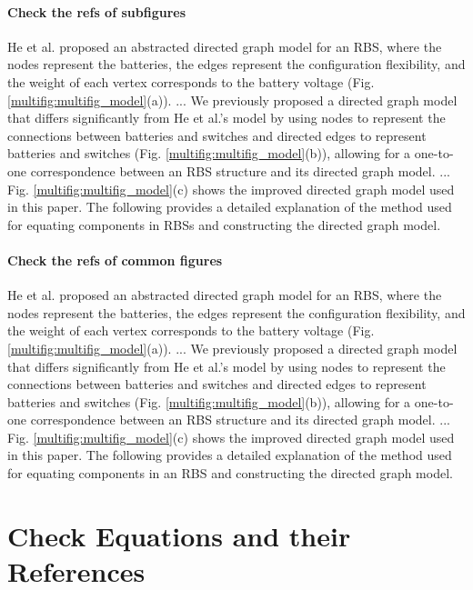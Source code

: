 \documentclass[a4paper]{article}
\begin{document}
\paragraph{Check the refs of subfigures}
He et al. \cite{heExploringAdaptiveReconfiguration2013} proposed an abstracted directed graph model for an RBS, where the nodes represent the batteries, the edges represent the configuration flexibility, and the weight of each vertex corresponds to the battery voltage (Fig. \ref{multifig:multifig_model}(a)). 
...
We previously proposed a directed graph model that differs significantly from He et al.'s model by using nodes to represent the connections between batteries and switches and directed edges to represent batteries and switches (Fig. \ref{multifig:multifig_model}(b)), allowing for a one-to-one correspondence between an RBS structure and its directed graph model. 
...
Fig. \ref{multifig:multifig_model}(c) shows the improved directed graph model used in this paper.
The following provides a detailed explanation of the method used for equating components in RBSs and constructing the directed graph model.

\paragraph{Check the refs of common figures}
He et al. \cite{heExploringAdaptiveReconfiguration2013} proposed an abstracted directed graph model for an RBS, where the nodes represent the batteries, the edges represent the configuration flexibility, and the weight of each vertex corresponds to the battery voltage (Fig. \ref{multifig:multifig_model}(a)). 
...
We previously proposed a directed graph model that differs significantly from He et al.'s model by using nodes to represent the connections between batteries and switches and directed edges to represent batteries and switches (Fig. \ref{multifig:multifig_model}(b)), allowing for a one-to-one correspondence between an RBS structure and its directed graph model. 
...
Fig. \ref{multifig:multifig_model}(c) shows the improved directed graph model used in this paper.
The following provides a detailed explanation of the method used for equating components in an RBS and constructing the directed graph model.

\section{Check Equations and their References}
\end{document}
